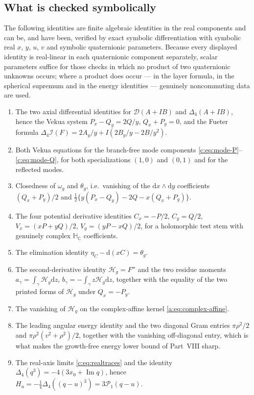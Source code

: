 \documentclass[11pt,a4paper]{article}
\numberwithin{equation}{section}
\theoremstyle{definition}
\theoremstyle{remark}
\theoremstyle{plain}
\newcommand{\HC}{\mathbb H_{\mathbb C}}
\DeclareMathOperator{\Ima}{Im}
\newcommand{\Dop}{\mathcal D}
\newcommand{\lap}{\Delta_4}
\newcommand{\I}{\mathcal I}
\newcommand{\om}{\omega}
\newcommand{\thet}{\theta}
\newcommand{\etaC}{\eta_{C}}
\newcommand{\pot}{C}          %
\newcommand{\potV}{V}         %
\newcommand{\Hg}{\mathcal H_{g}}      %
\newcommand{\dd}{\mathrm d}
\begin{document}
\subsection{What is checked symbolically}
\label{f:sub:symbolic}

The following identities are finite algebraic identities in the real
components and can be, and have been, verified by exact symbolic
differentiation with symbolic real $x$, $y$, $u$, $v$ and symbolic
quaternionic parameters. Because every displayed identity is real-linear in
each quaternionic component separately, scalar parameters suffice for those
checks in which no product of two quaternionic unknowns occurs; where a
product does occur --- in the layer formula, in the spherical supremum and
in the energy identities --- genuinely noncommuting data are used.

\begin{enumerate}[label=\textup{(S\arabic*)}]
\item The two axial differential identities for
$\Dop(A+IB)$ and $\lap(A+IB)$, hence the Vekua system
$P_x-Q_y=2Q/y$, $Q_x+P_y=0$, and the Fueter formula
$\lap\I(F)=2A_y/y+I(2B_y/y-2B/y^2)$.
\item Both Vekua equations for the branch-free mode components
\eqref{c:eq:mode-P}--\eqref{c:eq:mode-Q}, for both
specializations $(1,0)$ and $(0,1)$ and for the reflected modes.
\item Closedness of $\om_g$ and $\thet_g$, i.e.\ vanishing of the
$\dd x\wedge\dd y$ coefficients $(Q_x+P_y)/2$ and
$\tfrac12\{y(P_x-Q_y)-2Q-x(Q_x+P_y)\}$.
\item The four potential derivative identities
$\pot_x=-P/2$, $\pot_y=Q/2$, $\potV_x=(xP+yQ)/2$, $\potV_y=(yP-xQ)/2$,
for a holomorphic test stem with genuinely complex $\HC$ coefficients.
\item The elimination identity $\etaC-\dd(x\pot)=\thet_g$.
\item The second-derivative identity $\Hg=F''$ and the two residue
moments $a_\gamma=\int_\gamma\Hg\dd z$,
$b_\gamma=-\int_\gamma z\Hg\dd z$, together with the equality of the two
printed forms of $\Hg$ under $Q_x=-P_y$.
\item The vanishing of $\Hg$ on the complex-affine kernel
\eqref{a:eq:complex-affine}.
\item The leading angular energy identity and the two diagonal Gram
entries $\pi\rho^2/2$ and $\pi\rho^2(v^2+\rho^2)/2$, together with the
vanishing off-diagonal entry, which is what makes the growth-free energy
lower bound of Part~VIII sharp.
\item The real-axis limits \eqref{c:eq:realtraces} and the identity
$\lap(q^3)=-4(3x_0+\Ima q)$, hence
$H_u=-\tfrac14\lap((q-u)^3)=3\mathcal P_1(q-u)$.
\end{enumerate}
\end{document}
